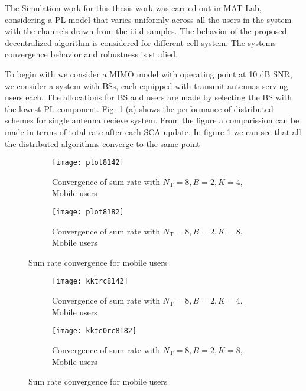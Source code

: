 

The Simulation work for this thesis work was carried out in MAT Lab, considering a \ac{PL} model that varies uniformly across all the users in the system with the channels drawn from the i.i.d samples. The behavior of the proposed decentralized algorithm is considered for different cell system. The systems convergence behavior and robustness is studied. 

To begin with we consider a \ac{MIMO} model with operating point at 10 dB \ac{SNR}, we consider a system with  \ac{BS}s, each equipped with  transmit antennas serving  users each. The allocations for \ac{BS} and users are made by selecting the \ac{BS} with the lowest \ac{PL} component. Fig. 1 (a) shows the  performance of distributed schemes for single antenna recieve system. From the figure a comparission can be made in terms of total rate after each \ac{SCA} update. In figure 1 we can see that all the distributed algorithms converge to the same point

\begin{figure}
	\centering
	\begin{subfigure}[b]{0.75\textwidth}
		\centering
		\texttt{[image: plot8142]}
		\caption{Convergence of sum rate with $N_\mathrm{T} = 8, B = 2, K = 4$, Mobile users}
		\label{fig_1}
	\end{subfigure}
	\begin{subfigure}[b]{0.75\textwidth}
		\centering
		\texttt{[image: plot8182]}
		\caption{Convergence of sum rate with $N_\mathrm{T} = 8, B = 2, K = 8$, Mobile users}
		\label{fig-2}
	\end{subfigure}
	\caption{Sum rate convergence for mobile users}
	\label{figII}
\end{figure}


\begin{figure}
	\centering
	\begin{subfigure}[b]{0.75\textwidth}
		\centering
		\texttt{[image: kktrc8142]}
		\caption{Convergence of sum rate with $N_\mathrm{T} = 8, B = 2, K = 4$, Mobile users}
		\label{fig_1}
	\end{subfigure}
	\begin{subfigure}[b]{0.75\textwidth}
		\centering
		\texttt{[image: kkte0rc8182]}
		\caption{Convergence of sum rate with $N_\mathrm{T} = 8, B = 2, K = 8$, Mobile users}
		\label{fig-2}
	\end{subfigure}
	\caption{Sum rate convergence for mobile users}
	\label{figII}
\end{figure}

